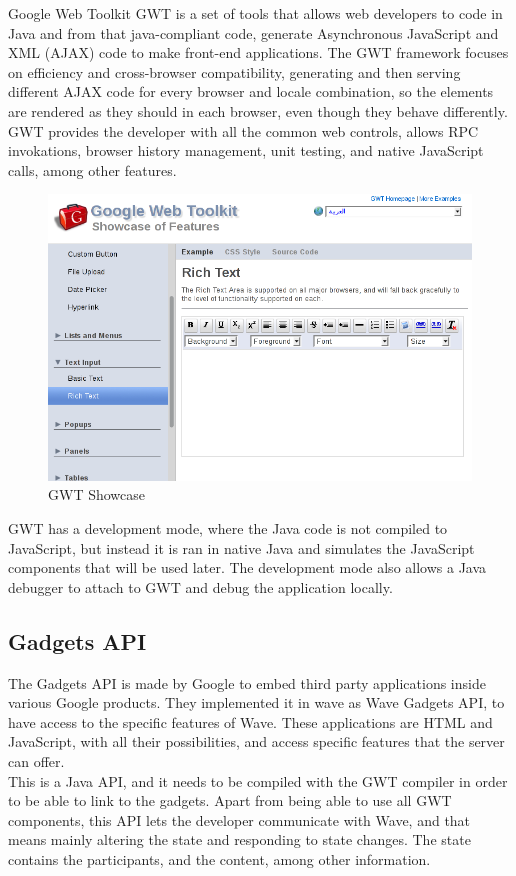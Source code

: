 Google Web Toolkit GWT is a set of tools that allows web developers to code in Java and from that java-compliant code, generate Asynchronous JavaScript and XML (AJAX) code to make front-end applications. The GWT framework focuses on efficiency and cross-browser compatibility, generating and then serving different AJAX code for every browser and locale combination, so the elements are rendered as they should in each browser, even though they behave differently. GWT provides the developer with all the common web controls, allows RPC invokations, browser history management, unit testing, and native JavaScript calls, among other features.\\[.2cm]
\begin{figure}[h]
  \center
    \includegraphics[keepaspectratio, scale=0.4]{Media/Captures/GWT/gwt_showcase.png}
  \caption{GWT Showcase}
  \label{fig:gwt_showcase}
\end{figure}
GWT has a development mode, where the Java code is not compiled to JavaScript, but instead it is ran in native Java and simulates the JavaScript components that will be used later. The development mode also allows a Java debugger to attach to GWT and debug the application locally. 


\subsection{Gadgets API}

The Gadgets API is made by Google to embed third party applications inside various Google products. They implemented it in wave as Wave Gadgets API, to have access to the specific features of Wave. These applications are HTML and JavaScript, with all their possibilities, and access specific features that the server can offer.\\[.3cm]
This is a Java API, and it needs to be compiled with the GWT compiler in order to be able to link to the gadgets. Apart from being able to use all GWT components, this API lets the developer communicate with Wave, and that means mainly altering the state and responding to state changes. The state contains the participants, and the content, among other information. 


